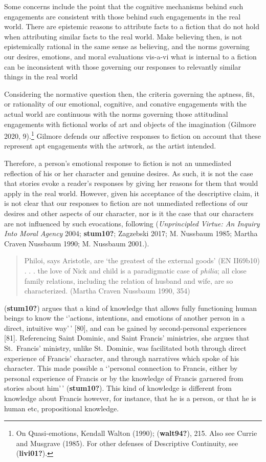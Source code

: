 \documentclass[12pt]{book}
\theoremstyle{definition}
\theoremstyle{remark}
\begin{document}
Some concerns include the point that the cognitive mechanisms behind such engagements are consistent with those behind such engagements in the real world. There are epistemic reasons to attribute facts to a fiction that do not hold when attributing similar facts to the real world. Make believing then, is not epistemically rational in the same sense as believing, and the norms governing our desires, emotions, and moral evaluations vis-a-vi what is internal to a fiction can be inconsistent with those governing our responses to relevantly similar things in the real world

Considering the normative question then, the criteria governing the aptness, fit, or rationality of our emotional, cognitive, and conative engagements with the actual world are continuous with the norms governing those attitudinal engagements with fictional works of art and objects of the imagination (Gilmore 2020, 9).\footnote{On Quasi-emotions, Kendall Walton (1990); (\textbf{walt94?}), 215. Also see Currie and Musgrave (1985). For other defenses of Descriptive Continuity, see (\textbf{livi01?}).} Gilmore defends our affective responses to fiction on account that these represent apt engagements with the artwork, as the artist intended.

Therefore, a person's emotional response to fiction is not an unmediated reflection of his or her character and genuine desires. As such, it is not the case that stories evoke a reader's responses by giving her reasons for them that would apply in the real world. However, given his acceptance of the descriptive claim, it is not clear that our responses to fiction are not unmediated reflections of our desires and other aspects of our character, nor is it the case that our characters are not influenced by such evocations, following (\emph{Unprincipled {Virtue}: {An Inquiry Into Moral Agency}} 2004; \textbf{stum10?}; Zagzebski 2017; M. Nussbaum 1985; Martha Craven Nussbaum 1990; M. Nussbaum 2001.).

\begin{quote}
Philoi, says Aristotle, are `the greatest of the external goods' (EN II69b10) . . . the love of Nick and child is a paradigmatic case of \emph{philia}; all close family relations, including the relation of husband and wife, are so characterized. (Martha Craven Nussbaum 1990, 354)
\end{quote}

(\textbf{stum10?}) argues that a kind of knowledge that allows fully functioning human beings to know the `'actions, intentions, and emotions of another person in a direct, intuitive way'\,' {[}80{]}, and can be gained by second-personal experiences
{[}81{]}. Referencing Saint Dominic, and Saint Francis' ministries, she argues that St.~Francis' ministry, unlike St.~Dominic, was facilitated both through
direct experience of Francis' character, and through narratives which
spoke of his character. This made possible a `'personal
connection to Francis, either by personal experience of Francis or by
the knowledge of Francis garnered from stories about him'\,' (\textbf{stum10?}). This kind of knowledge is different from knowledge about Francis however, for
instance, that he is a person, or that he is human etc, propositional knowledge.
\end{document}
